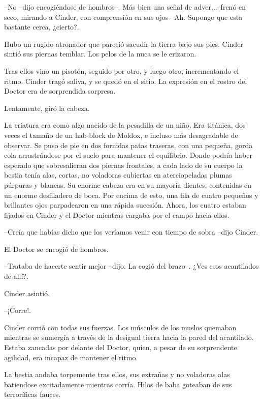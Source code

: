 --No --dijo encogiéndose de hombros--. Más bien una señal de adver...--frenó en seco, mirando a Cinder, con comprensión en sus ojos-- Ah. Supongo que esta bastante cerca, ¿cierto?.



Hubo un rugido atronador que pareció sacudir la tierra bajo sus pies. Cinder sintió sus piernas temblar. Los pelos de la nuca se le erizaron.

Tras ellos vino un pisotón, seguido por otro, y luego otro, incrementando el ritmo. Cinder tragó saliva, y se quedó en el sitio. La expresión en el rostro del Doctor era de sorprendida sorpresa.

Lentamente, giró la cabeza.

La criatura era como algo nacido de la pesadilla de un niño. Era titánica, dos veces el tamaño de un hab-block de Moldox, e incluso más desagradable de observar. Se puso de pie en dos fornidas patas traseras, con una pequeña, gorda cola arrastrándose por el suelo para mantener el equilibrio. Donde podría haber esperado que sobresalieran dos piernas frontales, a cada lado de su cuerpo la bestia tenía alas, cortas, no voladoras cubiertas en aterciopeladas plumas púrpuras y blancas. Su enorme cabeza era en su mayoría dientes, contenidas en un enorme desfiladero de boca. Por encima de esto, una fila de cuatro pequeños y brillantes ojos parpadearon en una rápida sucesión. Ahora, los cuatro estaban fijados en Cinder y el Doctor mientras cargaba por el campo hacia ellos.



--Creía que habías dicho que los veríamos venir con tiempo de sobra --dijo Cinder.



El Doctor se encogió de hombros. 



--Trataba de hacerte sentir mejor --dijo. La cogió del brazo--. ¿Ves esos acantilados de allí?.



Cinder asintió.



--¡Corre!.



Cinder corrió con todas sus fuerzas. Los músculos de los muslos quemaban mientras se sumergía a través de la desigual tierra hacia la pared del acantilado. Estaba zancadas por delante del Doctor, quien, a pesar de su sorprendente agilidad, era incapaz de mantener el ritmo.

La bestia andaba torpemente tras ellos, sus extrañas y no voladoras alas batiendose excitadamente mientras corría. Hilos de baba goteaban de sus terroríficas fauces.

